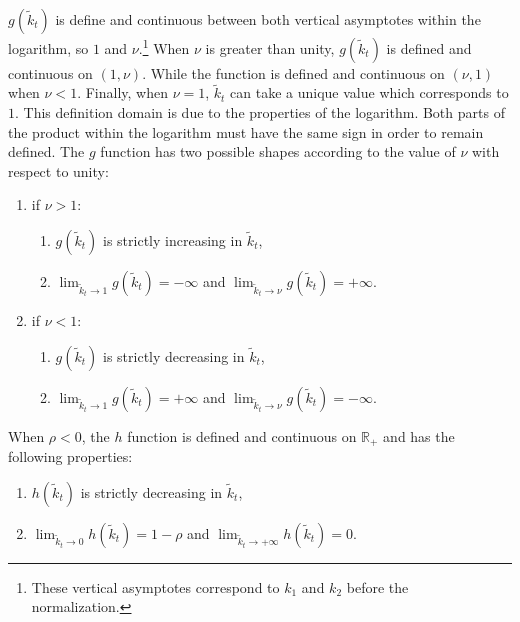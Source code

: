 $g(\tilde{k}_t)$ is define and continuous between both vertical asymptotes within the logarithm, so $1$ and $\nu$.\footnote{These vertical asymptotes correspond to $k_1$ and $k_2$ before the normalization.} When $\nu$ is greater than unity, $g(\tilde{k}_t)$ is defined and continuous on $\left(1, \nu\right)$. While the function is defined and continuous on $\left(\nu, 1\right)$ when $\nu < 1$. Finally, when $\nu = 1$, $\tilde{k}_t$ can take a unique value which corresponds to $1$. This definition domain is due to the properties of the logarithm. Both parts of the product within the logarithm must have the same sign in order to remain defined. The $g$ function has two possible shapes according to the value of $\nu$ with respect to unity:
\begin{enumerate}
	\item if $\nu > 1$:
	\begin{enumerate}
		\item $g(\tilde{k}_t)$ is strictly increasing in $\tilde{k}_t$,%
		\item $\lim_{\tilde{k}_t\to 1} g(\tilde{k}_t) = -\infty$  and $\lim_{\tilde{k}_t\to \nu} g(\tilde{k}_t) = +\infty$.
	\end{enumerate}
	\item if $\nu < 1$:
	\begin{enumerate}
		\item $g(\tilde{k}_t)$ is strictly decreasing in $\tilde{k}_t$,%
		\item $\lim_{\tilde{k}_t\to 1} g(\tilde{k}_t) = +\infty$ and $\lim_{\tilde{k}_t\to \nu} g(\tilde{k}_t) = -\infty$.
	\end{enumerate}
\end{enumerate}
When $\rho<0$, the $h$ function is defined and continuous on $\mathbb{R}_+$ and has the following properties:
\begin{enumerate}
	\item $h(\tilde{k}_t)$ is strictly decreasing in $\tilde{k}_t$,%
	\item $\lim_{\tilde{k}_t\to 0} h(\tilde{k}_t) = 1-\rho$ and $\lim_{\tilde{k}_t\to +\infty} h(\tilde{k}_t) = 0$.
\end{enumerate}

